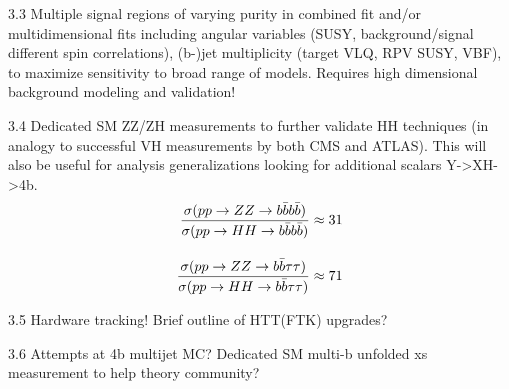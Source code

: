 3.3 Multiple signal regions of varying purity in combined fit and/or multidimensional fits including angular variables (SUSY, background/signal different spin correlations), (b-)jet multiplicity (target VLQ, RPV SUSY, VBF), to maximize sensitivity to broad range of models. Requires high dimensional background modeling and validation! 

3.4 Dedicated SM ZZ/ZH measurements to further validate HH techniques (in analogy to successful VH measurements by both CMS and ATLAS). This will also be useful for analysis generalizations looking for additional scalars Y->XH->4b. 
\begin{equation*}
  \begin{split}
    \frac{\sigma(pp\rightarrow ZZ\rightarrow b\bar{b}b\bar{b})  }{\sigma(pp\rightarrow HH\rightarrow b\bar{b}b\bar{b})  } &\approx 31 \\[10pt]
    \frac{\sigma(pp\rightarrow ZZ\rightarrow b\bar{b}\tau\tau)}{\sigma(pp\rightarrow HH\rightarrow b\bar{b}\tau\tau)} &\approx 71
  \end{split}
\end{equation*}

3.5 Hardware tracking! Brief outline of HTT(FTK) upgrades? 

3.6 Attempts at 4b multijet MC? Dedicated SM multi-b unfolded xs measurement to help theory community?
        



